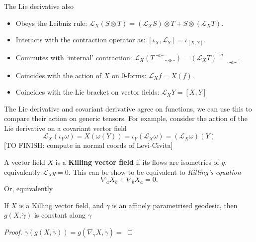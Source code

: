 \documentclass[12pt]{article}
\begin{document}
\begin{remark}
	The Lie derivative also 
		\begin{itemize}
			\item Obeys the Leibniz rule: $\mathcal{L}_X (S \otimes T) = (\mathcal{L}_X S) \otimes T + S \otimes (\mathcal{L}_X T)$.
			\item Interacts with the contraction operator as: $[\iota_X, \mathcal{L}_Y] = \iota_{[X,Y]}$.
			\item Commutes with `internal' contraction: $\mathcal{L}_X ({T^{\cdots a \cdots}}_{\cdots a \cdots} ) = {(\mathcal{L}_X T)^{\cdots a \cdots}}_{\cdots a \cdots}.$
			\item Coincides with the action of $X$ on $0$-forms: $\mathcal{L}_X f = X(f)$.
			\item Coincides with the Lie bracket on vector fields: $\mathcal{L}_X Y = [X,Y]$
		\end{itemize}
\end{remark}

\begin{example}
	The Lie derivative and covariant derivative agree on functions, we can use this to compare their action on generic tensors. For example, consider the action of the Lie derivative on a covariant vector field
		\begin{equation}
			\mathcal{L}_X (\iota_Y \omega) = X \left(\omega(Y) \right) = \iota_Y(\mathcal{L}_X \omega) = (\mathcal{L}_X \omega)(Y)
		\end{equation}
	[TO FINISH: compute in normal coords of Levi-Civita]
\end{example}

\begin{noteEquation}
	A vector field $X$ is a \textbf{Killing vector field} if its flows are isometries of $g$, equivalently $\mathcal{L}_X g = 0$. This can be show to be equivalent to \textit{Killing's equation}
		\begin{equation}
			\nabla_a X_b + \nabla_b X_a = 0.
		\end{equation}
	Or, equivalently
\end{noteEquation}

\begin{lemma}
	If $X$ is a Killing vector field, and $\gamma$ is an affinely parametrised geodesic, then $g(X,\dot{\gamma})$ is constant along $\gamma$
\end{lemma}
\begin{proof}
	$\dot{\gamma}\left( g(X,\dot{\gamma} ) \right) = g( \nabla_{\dot{\gamma}} X, \dot{\gamma} ) = $
\end{proof}
\end{document}
